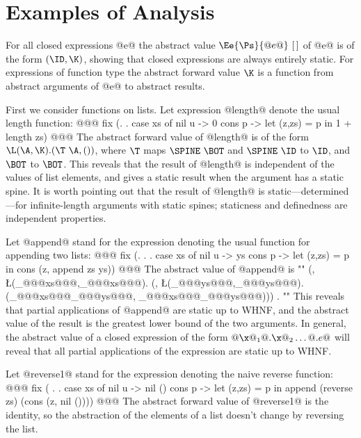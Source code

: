 \documentclass[11pt]{article}
\begin{document}
\section{Examples of Analysis}

For all closed expressions @e@ the abstract value
$\Ee{\Ps}{@e@}~[\,]$ of @e@ is of the form $(\ID,\K)$, showing
that closed expressions are always entirely static.  For expressions of
function type the abstract forward value $\K$ is a function from
abstract arguments of @e@ to abstract results.

First we consider functions on lists.
Let expression @length@ denote the usual length function:
@@@
     fix (\length . \xs . case xs of
                            nil u  -> 0
                            cons p -> let (z,zs) = p in
                                        1 + length zs)
@@@
The abstract forward value of @length@ is of the form
$\L(\A,\K).(\T~\A,())$, where $\T$ maps $\SPINE~\BOT$ and $\SPINE~\ID$
to $\ID$, and $\BOT$ to $\BOT$.  This reveals that the result of
@length@ is independent of the values of list elements, and gives
a static result when the argument has a static spine.  It is worth
pointing out that the result of @length@ is static---determined---for
infinite-length arguments with static spines; staticness and definedness
are independent properties.


Let @append@ stand for the expression denoting the usual function for
appending two lists:
@@@
     fix (\append . \xs . \ys . case xs of
                                  nil u  -> ys
                                  cons p -> let (z,zs) = p in
		                              cons (z, 
						    append zs ys))
@@@
The abstract value of @append@ is
""
(\ID, \L(\A_{@@@xs@@@},\K_{@@@xs@@@}).
(\ID, \L(\A_{@@@ys@@@},\K_{@@@ys@@@}).
(\A_{@@@xs@@@}\glb\A_{@@@ys@@@}, \K_{@@@xs@@@}\glb\K_{@@@ys@@@}))) .
""
This reveals that partial applications of @append@ are static up to
WHNF, and the abstract value of the result is the greatest lower bound
of the two arguments.  In general, the abstract value of a closed
expression of the form $@\x@_1@.\x@_2\ldots@.e@$ will reveal that all
partial applications of the expression are static up to WHNF.

Let @reverse1@ stand for the expression denoting the naive reverse
function:
@@@
     fix ( . \xs . case xs of
                              nil u  -> nil ()
                              cons p -> let (z,zs) = p in
                                          append (reverse zs) 
			                         (cons (z, nil ())))
@@@
The abstract forward value of @reverse1@ is the identity, so the
abstraction of the elements of a list doesn't change by reversing the
list.
\end{document}
